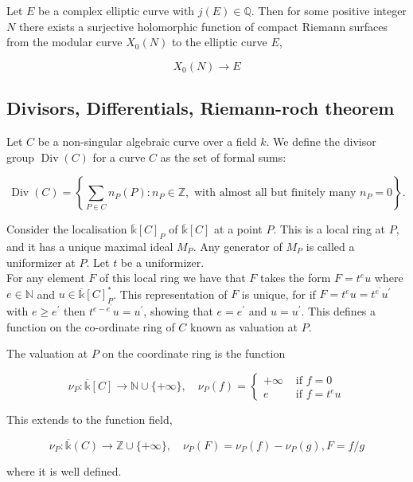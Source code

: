\begin{theorem}


   Let $E$ be a complex elliptic curve with $j(E) \in \mathbb{Q}$. Then for some positive integer $N$ there exists a surjective holomorphic function of compact Riemann surfaces from the modular curve $X_{0}(N)$ to the elliptic curve $E$,

$$
X_{0}(N) \longrightarrow E
$$
 
\end{theorem}

\subsection{Divisors, Differentials, Riemann-roch theorem}

\begin{definition}
Let $C$ be a non-singular algebraic curve over a field $k$. We define the divisor group \(\operatorname{Div}(C)\) for a curve \( C \) as the set of formal sums:

\[
\operatorname{Div}(C) = \left\{ \sum_{P \in C} n_{P}(P) : n_{P} \in \mathbb{Z}, \text{ with almost all  but finitely many } n_{P} = 0 \right\}.
\]

\end{definition}


Consider the localisation $\overline{\mathbb{k}}[C]_{P}$ of $\overline{\mathbb{k}}[C]$ at a point $P$. This is a local ring at $P$, and it has a unique maximal ideal $M_P$. 
Any generator of $M_P$ is called a uniformizer at $P$. Let $t$ be a uniformizer. \\
For any element $F$ of this local ring we have that $F$ takes the form $F=t^{e} u$ where $e \in \mathbb{N}$ and $u \in \overline{\mathbb{k}}[C]_{P}^{*}$. This representation of $F$ is unique, for if $F=t^{e} u=t^{e^{\prime}} u^{\prime}$ with $e \geq e^{\prime}$ then $t^{e-e^{\prime}} u=u^{\prime}$, showing that $e=e^{\prime}$ and $u=u^{\prime}$. This defines a function on the co-ordinate ring of $C$ known as valuation at $P$.

\begin{definition}
    The valuation at $P$ on the coordinate ring is the function

$$
\nu_{P}: \overline{\mathbb{k}}[C] \longrightarrow \mathbb{N} \cup\{+\infty\}, \quad \nu_{P}(f)= \begin{cases}+\infty & \text { if } f=0 \\ e & \text { if } f=t^{e} u\end{cases}
$$

This extends to the function field,

$$
\nu_{P}: \overline{\mathbb{k}}(C) \longrightarrow \mathbb{Z} \cup\{+\infty\}, \quad \nu_{P}(F)=\nu_{P}(f)-\nu_{P}(g), F=f / g
$$

where it is well defined. 
\end{definition}




